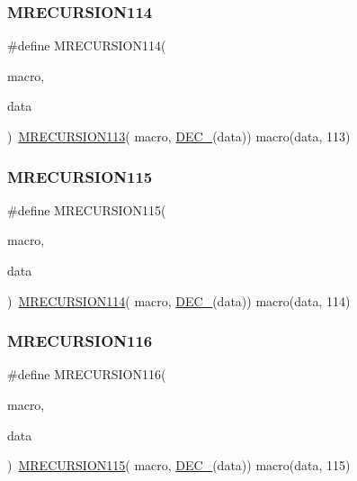 \subsubsection{\texorpdfstring{MRECURSION114}{MRECURSION114}}
{\footnotesize\ttfamily \#define M\+R\+E\+C\+U\+R\+S\+I\+O\+N114(\begin{DoxyParamCaption}\item[{}]{macro,  }\item[{}]{data }\end{DoxyParamCaption})~\mbox{\hyperlink{group__group__sam0__utils__mrecursion_ga4f47c8ada861a739b042e92989a455d6}{M\+R\+E\+C\+U\+R\+S\+I\+O\+N113}}(  macro, \mbox{\hyperlink{group__group__sam0__utils__mrecursion_ga1d23d683797679dca8c3512a54a5dcae}{D\+E\+C\+\_\+}}(data))   macro(data, 113)}

\mbox{\label{group__group__sam0__utils__mrecursion_ga1c977ad5b01e08a40d348d2ea87fedbb}} 
\subsubsection{\texorpdfstring{MRECURSION115}{MRECURSION115}}
{\footnotesize\ttfamily \#define M\+R\+E\+C\+U\+R\+S\+I\+O\+N115(\begin{DoxyParamCaption}\item[{}]{macro,  }\item[{}]{data }\end{DoxyParamCaption})~\mbox{\hyperlink{group__group__sam0__utils__mrecursion_ga642f08b42d8b06e2c23282224fd77a28}{M\+R\+E\+C\+U\+R\+S\+I\+O\+N114}}(  macro, \mbox{\hyperlink{group__group__sam0__utils__mrecursion_ga1d23d683797679dca8c3512a54a5dcae}{D\+E\+C\+\_\+}}(data))   macro(data, 114)}

\mbox{\label{group__group__sam0__utils__mrecursion_ga32fe65002e3a25cc50fb1344dbada748}} 
\subsubsection{\texorpdfstring{MRECURSION116}{MRECURSION116}}
{\footnotesize\ttfamily \#define M\+R\+E\+C\+U\+R\+S\+I\+O\+N116(\begin{DoxyParamCaption}\item[{}]{macro,  }\item[{}]{data }\end{DoxyParamCaption})~\mbox{\hyperlink{group__group__sam0__utils__mrecursion_ga1c977ad5b01e08a40d348d2ea87fedbb}{M\+R\+E\+C\+U\+R\+S\+I\+O\+N115}}(  macro, \mbox{\hyperlink{group__group__sam0__utils__mrecursion_ga1d23d683797679dca8c3512a54a5dcae}{D\+E\+C\+\_\+}}(data))   macro(data, 115)}

